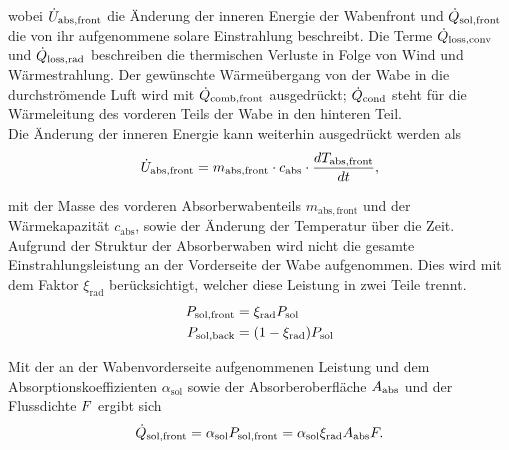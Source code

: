\vspace*{-\baselineskip}wobei $\dot{U}_{\mathrm{abs}, \mathrm{front}}$ die Änderung der inneren Energie der Wabenfront und $\dot{Q}_{\mathrm{sol,front}}$ die von ihr aufgenommene solare Einstrahlung beschreibt.
Die Terme $\dot{Q}_{\mathrm{loss,conv}}$ und $\dot{Q}_{\mathrm{loss,rad}}$ beschreiben die thermischen Verluste in Folge von Wind und Wärmestrahlung.
Der gewünschte Wärmeübergang von der Wabe in die durchströmende Luft wird mit $\dot{Q}_{\mathrm{comb,front}}$ ausgedrückt; $\dot{Q}_{\mathrm{cond}}$ steht für die Wärmeleitung des vorderen Teils der Wabe in den hinteren Teil.\\
Die Änderung der inneren Energie kann weiterhin ausgedrückt werden als
\begin{equation} \label{eq_InnereEnergie}
\dot{U}_{\mathrm{abs}, \mathrm{front}} = m_{\mathrm{abs,front}} \cdot c_{\mathrm{abs}} \cdot \frac{d T_{\mathrm{abs,front}}}{d t},
\end{equation}

\vspace*{-\baselineskip}mit der Masse des vorderen Absorberwabenteils $m_{\mathrm{abs,front}}$ und der Wärmekapazität $c_{\mathrm{abs}}$, sowie der Änderung der Temperatur über die Zeit.\\
Aufgrund der Struktur der Absorberwaben wird nicht die gesamte Einstrahlungsleistung an der Vorderseite der Wabe aufgenommen.
Dies wird mit dem Faktor $\xi_{\mathrm{rad}}$ berücksichtigt, welcher diese Leistung in zwei Teile trennt.
\begin{equation} \label{eq_SolareLeistung}
    \begin{aligned}
        P_{\mathrm{sol,front}} & = \xi_{\mathrm{rad}} P_{\mathrm{sol}}     \\
        P_{\mathrm{sol,back}}  & = (1-\xi_{\mathrm{rad}}) P_{\mathrm{sol}}
    \end{aligned}
\end{equation}

Mit der an der Wabenvorderseite aufgenommenen Leistung und dem Absorptionskoeffizienten $\alpha_{\mathrm{sol}}$ sowie der Absorberoberfläche $A_{\mathrm{abs}}$ und der Flussdichte $F$ ergibt sich
\begin{equation} \label{eq_SolareEinstrahlung}
\dot{Q}_{\mathrm{sol,front}} = \alpha_{\mathrm{sol}} P_{\mathrm{sol,front}} = \alpha_{\mathrm{sol}} \xi_{\mathrm{rad}} A_{\mathrm{abs}} F.
\end{equation}

